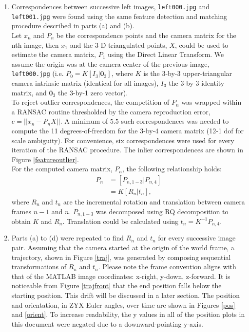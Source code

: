 \documentclass[12pt]{article} %
\begin{document}
\begin{enumerate}[label=\alph*)]
\item %
Correspondences between successive left images, \texttt{left000.jpg} and \texttt{left001.jpg} were found using the same feature detection and matching procedure described in parts (a) and (b).\\[12pt]
Let $x_n$ and $P_n$ be the correspondence points and the camera matrix for the nth image, then $x_1$ and the 3-D triangulated points, $X$, could be used to estimate the camera matrix, $P_1$ using the Direct Linear Transform. We assume the origin was at the camera center of the previous image, \texttt{left000.jpg} (i.e. $P_0 = K[I_3 | \textbf{0}_3]$, where $K$ is the 3-by-3 upper-triangular camera intrinsic matrix (identical for all images), $I_3$ the 3-by-3 identity matrix, and $\textbf{0}_3$ the 3-by-1 zero vector).\\[12pt]
To reject outlier correspondences, the competition of $P_n$ was wrapped within a RANSAC routine thresholded by the camera reproduction error, $e = || x_n - P_nX ||$. A minimum of 5.5 such correspondences was needed to compute the 11 degrees-of-freedom for the 3-by-4 camera matrix (12-1 dof for scale ambiguity). For convenience, six correspondences were used for every iteration of the RANSAC procedure. The inlier correspondences are shown in Figure \ref{featureoutlier}.\\[12pt]
For the computed camera matrix, $P_n$, the following relationship holds:
\begin{align*}
	P_n &= [P_{n, 1-3} | P_{n, 4}]\\
	&= K[R_n | t_n],
\end{align*}
where $R_n$ and $t_n$ are the incremental rotation and translation between camera frames $n-1$ and $n$. $P_{n, 1-3}$ was decomposed using RQ decomposition to obtain $K$ and $R_n$. Translation could be calculated using $t_n = K^{-1}P_{n, 4}$.

\item %
Parts (a) to (d) were repeated to find $R_n$ and $t_n$ for every successive image pair. Assuming that the camera started at the origin of the world frame, a trajectory, shown in Figure \ref{traj}, was generated by composing sequential transformations of $R_n$ and $t_n$. Please note the frame convention aligns with that of the MATLAB image coordinates: x-right, y-down, z-forward. It is noticeable from Figure \ref{trajfront} that the end position falls below the starting position. This drift will be discussed in a later section. The position and orientation, in ZYX Euler angles, over time are shown in Figures \ref{pos} and \ref{orient}. To increase readability, the y values in all of the position plots in this document were negated due to a downward-pointing y-axis.


\end{enumerate}
\end{document}
